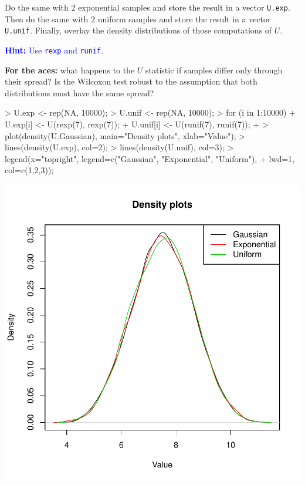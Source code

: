 \documentclass[a4paper]{article}
\theoremstyle{definition}
\begin{document}
\begin{Exercise}
Do the same with 2 exponential samples and store the result in a vector
\texttt{U.exp}. Then do the same with 2 uniform samples and store the
result in a vector \texttt{U.unif}. Finally, overlay the density
distributions of those computations of $U$.
\par\noindent\textcolor{Blue}{\textbf{Hint:} Use \texttt{rexp} and
\texttt{runif}.}
\par\noindent\textcolor{BrickRed}{\textbf{For the aces:} what happens
to the $U$ statistic if samples differ only through their spread?
Is the Wilcoxon test robust to the assumption that both distributions
must have the same spread?}
\end{Exercise}
\begin{Answer}
\begin{Schunk}
\begin{Sinput}
> U.exp <- rep(NA, 10000);
> U.unif <- rep(NA, 10000);
> for (i in 1:10000) {
+    U.exp[i] <- U(rexp(7), rexp(7));
+    U.unif[i] <- U(runif(7), runif(7));
+ }
> plot(density(U.Gaussian), main="Density plots", xlab="Value");
> lines(density(U.exp), col=2);
> lines(density(U.unif), col=3);
> legend(x="topright", legend=c("Gaussian", "Exponential", "Uniform"),
+    lwd=1, col=c(1,2,3));
\end{Sinput}
\end{Schunk}
\includegraphics{wilcoxon-005}
\end{Answer}
\end{document}
